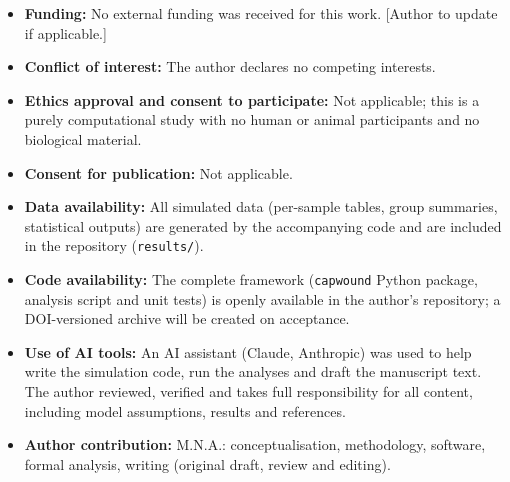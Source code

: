 \documentclass[pdflatex,sn-mathphys-num]{sn-jnl}%
\begin{document}
\begin{itemize}
\item \textbf{Funding:} No external funding was received for this work. [Author to update if applicable.]
\item \textbf{Conflict of interest:} The author declares no competing interests.
\item \textbf{Ethics approval and consent to participate:} Not applicable; this is a purely computational study with no human or animal participants and no biological material.
\item \textbf{Consent for publication:} Not applicable.
\item \textbf{Data availability:} All simulated data (per-sample tables, group summaries, statistical outputs) are generated by the accompanying code and are included in the repository (\texttt{results/}).
\item \textbf{Code availability:} The complete framework (\texttt{capwound} Python package, analysis script and unit tests) is openly available in the author's repository; a DOI-versioned archive will be created on acceptance.
\item \textbf{Use of AI tools:} An AI assistant (Claude, Anthropic) was used to help write the simulation code, run the analyses and draft the manuscript text. The author reviewed, verified and takes full responsibility for all content, including model assumptions, results and references.
\item \textbf{Author contribution:} M.N.A.: conceptualisation, methodology, software, formal analysis, writing (original draft, review and editing).
\end{itemize}


\end{document}
